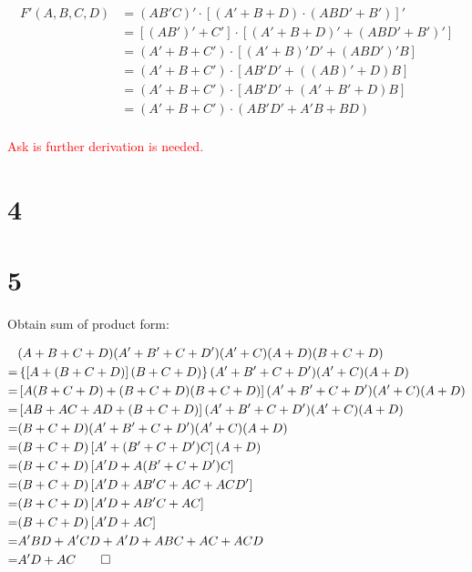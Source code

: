 \documentclass{article}
\begin{document}
\begin{align*}
    F'(A, B, C, D) &= (AB'C)' \cdot \left[(A' + B + D) \cdot (ABD' + B')\right]' \\
    &= \left[\left(AB'\right)' + C' \right] \cdot \left[\left(A' + B + D\right)' + \left(ABD' + B'\right)'\right] \\
    &= \left( A' + B + C' \right) \cdot \left[\left(A' + B\right)'D' + \left(ABD'\right)'B\right] \\
    &= \left( A' + B + C' \right) \cdot \left[ AB'D' + \left(\left(AB\right)' + D\right)B\right] \\
    &= \left( A' + B + C' \right) \cdot \left[ AB'D' + \left(A' + B' + D\right)B\right] \\
    &= \left( A' + B + C' \right) \cdot \left( AB'D' + A'B + BD\right) \\
\end{align*}

\textcolor{red}{Ask is further derivation is needed.}


\newpage

\section*{4}

\newpage

\section*{5}

Obtain sum of product form:

\begin{align*}
    &(A + B + C + D)(A' + B' + C + D')(A' + C)(A + D)(B + C + D) \\
    =& \left\{\left[A + (B + C + D)\right](B + C + D)\right\}(A' + B' + C + D')(A' + C)(A + D) \\
    =& \left[A(B + C + D) + (B + C + D)(B + C + D)\right](A' + B' + C + D')(A' + C)(A + D) \\
    =& \left[AB + AC + AD + (B + C + D)\right](A' + B' + C + D')(A' + C)(A + D) \\
    =& (B + C + D)(A' + B' + C + D')(A' + C)(A + D) \\
    =& (B + C + D)\left[A' + (B' + C + D')C\right](A + D) \\
    =& (B + C + D)\left[A'D + A(B' + C + D')C\right] \\
    =& (B + C + D)\left[A'D + AB'C + AC + ACD'\right] \\
    =& (B + C + D)\left[A'D + AB'C + AC\right] \\
    =& (B + C + D)\left[A'D + AC\right] \\
    =& A'BD + A'CD + A'D + ABC + AC + ACD \\
    =& A'D + AC \qed
\end{align*}
\end{document}
